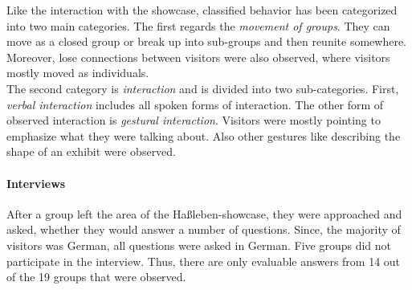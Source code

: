 Like the interaction with the showcase, classified behavior has been categorized into two main categories. The first regards the \textit{movement of groups}. They can move as a closed group or break up into sub-groups and then reunite somewhere. Moreover, lose connections between visitors were also observed, where visitors mostly moved as individuals.
\\
The second category is \textit{interaction} and is divided into two sub-categories. First, \textit{verbal interaction} includes all spoken forms of interaction. The other form of observed interaction is \textit{gestural interaction}. Visitors were mostly pointing to emphasize what they were talking about. Also other gestures like describing the shape of an exhibit were observed.


\paragraph{Interviews} After a group left the area of the Haßleben-showcase, they were approached and asked, whether they would answer a number of questions. Since, the majority of visitors was German, all questions were asked in German. Five groups did not participate in the interview. Thus, there are only evaluable answers from 14 out of the 19 groups that were observed. 

